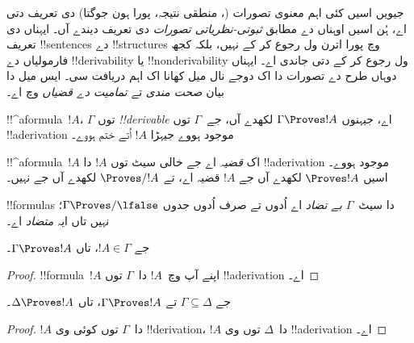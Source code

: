 \documentclass[../../../include/open-logic-section]{subfiles}
\begin{document}
      {}
      {}


\begin{explain}
جیویں اسیں کئی اہم معنوی تصورات
(، منطقی نتیجہ، پورا ہون
جوگتا) دی تعریف دتی اے، ہُن اسیں اوہناں دے مطابق
\emph{ثبوتی-نظریاتی تصورات} دی تعریف دیندے آں۔ ایہناں دی تعریف
!!{sentence}s دے !!{structure}s وچ پورا اترن ول رجوع کر کے نہیں،
بلکہ کجھ فارمولیاں دے !!{derivability} یا !!{nonderivability} ول
رجوع کر کے دتی جاندی اے۔ ایہناں دوہاں طرح دے تصورات دا اک دوجے
نال میل کھانا اک اہم دریافت سی۔ ایس میل دا بیان \emph{صحت مندی}
تے \emph{تمامیت دے قضیاں} وچ اے۔
\end{explain}

\begin{defn}[!!^{derivability}]
!!^a{formula}~$!A$، $\Gamma$ توں \emph{!!{derivable}} اے، جیہنوں
$\Gamma \Proves !A$ لکھدے آں، جے~$\Gamma$ توں !!a{derivation}
موجود ہووے جیہڑا $!A$ اُتے ختم ہووے۔
\end{defn}

\begin{defn}[قضیے]
!!^a{formula}~$!A$ اک \emph{قضیہ} اے جے خالی سیٹ توں $!A$ دا
!!a{derivation} موجود ہووے۔ اسیں $\Proves !A$ لکھدے آں جے $!A$
قضیہ اے، تے $\Proves/ !A$ لکھدے آں جے نہیں۔
\end{defn}

\begin{defn}[بے تضادی]
!!{formula}s دا سیٹ~$\Gamma$ \emph{بے تضاد} اے اُدوں تے صرف اُدوں
جدوں $\Gamma\Proves/ \lfalse$؛ نہیں تاں ایہ \emph{متضاد} اے۔
\end{defn}

\begin{prop}[انعکاسیت]
جے $!A \in \Gamma$، تاں $\Gamma \Proves !A$۔
\end{prop}

\begin{proof}
  !!{formula}~$!A$ اپنے آپ وچ~$!A$ دا~$\Gamma$ توں
  !!a{derivation} اے۔
\end{proof}

\begin{prop}[یک رُخیت]
جے $\Gamma \subseteq \Delta$ تے $\Gamma \Proves !A$، تاں $\Delta
\Proves !A$۔
\end{prop}

\begin{proof}
$!A$ دا~$\Gamma$ توں کوئی وی !!{derivation}، $!A$ دا~$\Delta$
توں وی !!a{derivation} اے۔
\end{proof}
\end{document}
